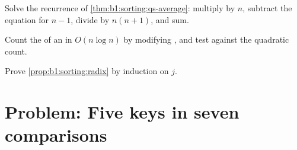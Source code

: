 \begin{exercise}[$\star\star\star$]\label{exo:b1:sorting:10}
Solve the recurrence of \cref{thm:b1:sorting:qs-average}: multiply by $n$, subtract the equation for $n - 1$, divide by
$n(n + 1)$, and sum.
\end{exercise}

\begin{exercise}[$\star\star\star$]\label{exo:b1:sorting:11}
Count the  of an  in $O(n \log n)$ by modifying , and test against the quadratic count.
\end{exercise}

\begin{exercise}[$\star\star\star$]\label{exo:b1:sorting:12}
Prove \cref{prop:b1:sorting:radix} by induction on $j$.
\end{exercise}

\section{Problem: Five keys in seven comparisons}\label{sec:b1:sorting:problem}

